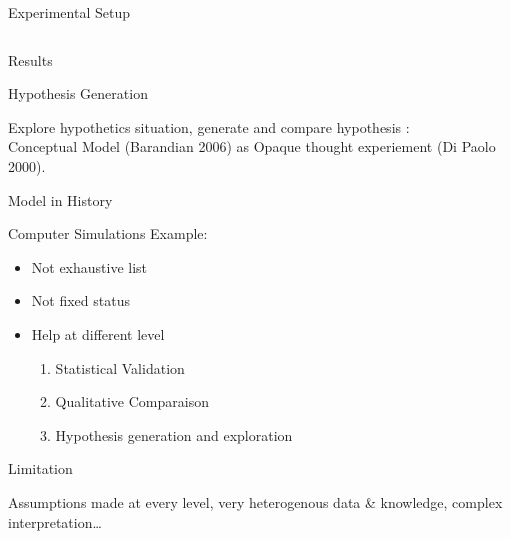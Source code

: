 \documentclass[12pt, notes=show,handout=no]{beamer}
\begin{document}
\begin{frame}{Experimental Setup}
\begin{tabular}{m{5cm}m{5cm}}
    \end{tabular}

\end{frame}

\begin{frame}{Results}


	
\end{frame}


\begin{frame}{Hypothesis Generation}
    
    Explore hypothetics situation, generate and compare hypothesis :\\
    \vfill
    \hspace{.5cm}Conceptual Model (Barandian 2006) as Opaque thought experiement (Di Paolo 2000).
    \vfill

\end{frame}

\begin{frame}{Model in History}

    Computer Simulations Example:
    \begin{itemize}
	\item Not exhaustive list
	\item Not fixed status
	\item Help at different level
	    \begin{enumerate}
		\item Statistical Validation
		\item Qualitative Comparaison
		\item Hypothesis generation and exploration
	    \end{enumerate}

    \end{itemize}
    

\end{frame}

\begin{frame}{Limitation}
    \begin{center}
	Assumptions made at every level, very heterogenous data \& knowledge, complex interpretation\dots
    \end{center}
\end{frame}
\end{document}
